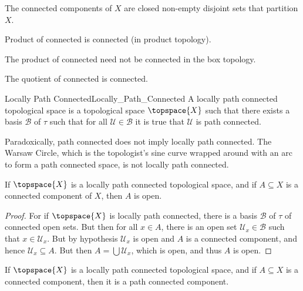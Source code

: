     \begin{theorem}
        The connected components of $X$ are closed non-empty disjoint sets
        that partition $X$.
    \end{theorem}
    \begin{theorem}
        Product of connected is connected (in product topology).
    \end{theorem}
    The product of connected need not be connected in the box topology.
    \begin{theorem}
        The quotient of connected is connected.
    \end{theorem}
    \begin{fdefinition}{Locally Path Connected}{Locally_Path_Connected}
        A locally path connected topological space is a topological space
        $\topspace{X}$ such that there exists a basis $\mathcal{B}$ of
        $\tau$ such that for all $\mathcal{U}\in\mathcal{B}$ it is true that
        $\mathcal{U}$ is path connected.
    \end{fdefinition}
    \begin{example}
        Paradoxically, path connected does not imply locally path connected.
        The Warsaw Circle, which is the topologist's sine curve wrapped
        around with an arc to form a path connected space, is not locally
        path connected.
    \end{example}
    \begin{theorem}
        If $\topspace{X}$ is a locally path connected topological space, and
        if $A\subseteq{X}$ is a connected component of $X$, then $A$ is
        open.
    \end{theorem}
    \begin{proof}
        For if $\topspace{X}$ is locally path connected, there is a basis
        $\mathcal{B}$ of $\tau$ of connected open sets. But then for all
        $x\in{A}$, there is an open set $\mathcal{U}_{x}\in\mathcal{B}$
        such that $x\in\mathcal{U}_{x}$. But by hypothesis
        $\mathcal{U}_{x}$ is open and $A$ is a connected component, and
        hence $\mathcal{U}_{x}\subseteq{A}$. But then
        $A=\bigcup\mathcal{U}_{x}$, which is open, and thus $A$ is open.
    \end{proof}
    \begin{theorem}
        If $\topspace{X}$ is a locally path connected topological space, and
        if $A\subseteq{X}$ is a connected component, then it is a path
        connected component.
    \end{theorem}
